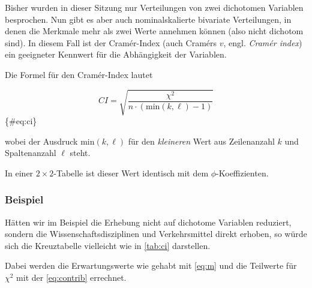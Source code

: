 \documentclass[
  ngerman,
]{article}
\begin{document}
Bisher wurden in dieser Sitzung nur Verteilungen von zwei dichotomen Variablen besprochen. Nun gibt es aber auch nominalskalierte bivariate Verteilungen, in denen die Merkmale mehr als zwei Werte annehmen können (also nicht dichotom sind). In diesem Fall ist der Cramér-Index (auch Cramérs \(v\), engl. \emph{Cramér index}) ein geeigneter Kennwert für die Abhängigkeit der Variablen.

Die Formel für den Cramér-Index lautet

\[
\mathit{CI}=\sqrt{\frac{\chi^2}{n\cdot (\mathrm{min}(k, \ell)-1)}}
\]\{\#eq:ci\}

wobei der Ausdruck \(\mathrm{min}(k,\ell)\) für den \emph{kleineren} Wert aus Zeilenanzahl \(k\) und Spaltenanzahl \(\ell\) steht.

In einer \(2\times2\)-Tabelle ist dieser Wert identisch mit dem \(\phi\)-Koeffizienten.

\hypertarget{beispiel-34}{%
\subsubsection{Beispiel}\label{beispiel-34}}

Hätten wir im Beispiel die Erhebung nicht auf dichotome Variablen reduziert, sondern die Wissenschaftsdisziplinen und Verkehrsmittel direkt erhoben, so würde sich die Kreuztabelle vielleicht wie in \autoref{tab:ci} darstellen.

Dabei werden die Erwartungswerte wie gehabt mit \autoref{eq:m} und die Teilwerte für \(\chi^2\) mit der \autoref{eq:contrib} errechnet.
\end{document}
